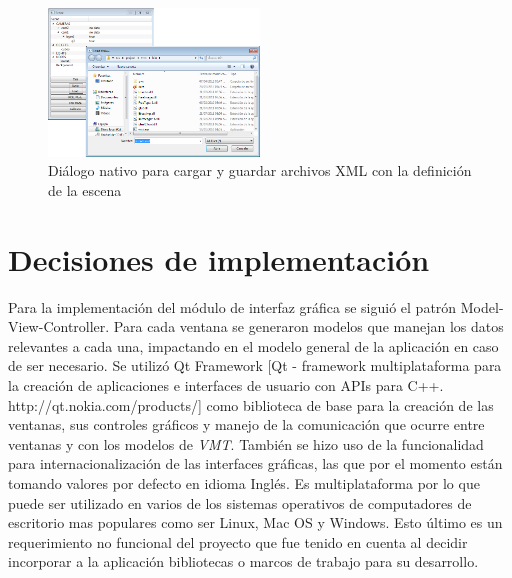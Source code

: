 \begin{figure}[H]
  \centering
    \includegraphics[width=0.5\textwidth]{./Cap5_vmt/vmt_loadShow.png}
  \caption{Diálogo nativo para cargar y guardar archivos XML con la definición de la escena}
  \label{fig:VMT-XML}
\end{figure}

\section{Decisiones de implementación}
Para la implementación del módulo de interfaz gráfica se siguió el patrón Model-View-Controller. Para cada ventana se generaron modelos que manejan los datos relevantes a cada una, impactando en el modelo general de la aplicación en caso de ser necesario.
Se utilizó Qt Framework [Qt - framework multiplataforma para la creación de aplicaciones e interfaces de usuario con APIs para C++. http://qt.nokia.com/products/] como biblioteca de base para la creación de las ventanas, sus controles gráficos y manejo de la comunicación que ocurre entre ventanas y con los modelos de \emph{VMT}. También se hizo uso de la funcionalidad para internacionalización de las interfaces gráficas, las que por el momento están tomando valores por defecto en idioma Inglés. Es multiplataforma por lo que puede ser utilizado en varios de los sistemas operativos de computadores de escritorio mas populares como ser Linux, Mac OS y Windows. Esto último es un requerimiento no funcional del proyecto que fue tenido en cuenta al decidir incorporar a la aplicación bibliotecas o marcos de trabajo para su desarrollo.
